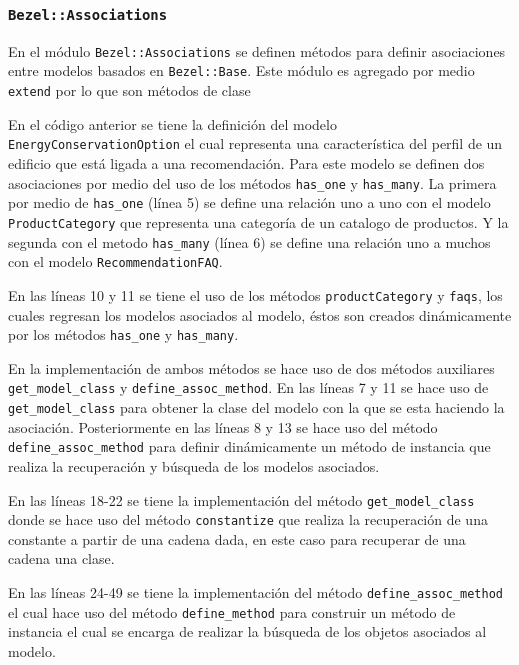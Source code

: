 \subsubsection{\texttt{Bezel::Associations}}

En el módulo \texttt{Bezel::Associations} se definen métodos para definir
asociaciones entre modelos basados en \texttt{Bezel::Base}. Este módulo
es agregado por medio \texttt{extend} por lo que son métodos de clase



En el código anterior se tiene la definición del modelo
\texttt{EnergyConservationOption} el cual representa una característica del perfil
de un edificio que está ligada a una recomendación. Para este modelo se definen
dos asociaciones por medio del uso de los métodos \texttt{has\_one} y
\texttt{has\_many}. La primera por medio de \texttt{has\_one} (línea 5) se define
una relación uno a uno con el modelo \texttt{ProductCategory} que representa una
categoría de un catalogo de productos. Y la segunda con el metodo \texttt{has\_many}
(línea 6) se define una relación uno a muchos con el
modelo \texttt{RecommendationFAQ}.

En las líneas 10 y 11 se tiene el uso de los métodos \texttt{productCategory} y
\texttt{faqs}, los cuales regresan los modelos asociados al modelo, éstos son creados
dinámicamente por los métodos \texttt{has\_one} y \texttt{has\_many}.



En la implementación de ambos métodos se hace uso de dos métodos auxiliares
\texttt{get\_model\_class} y \texttt{define\_assoc\_method}.
En las líneas 7 y 11 se hace uso de \texttt{get\_model\_class} para obtener
la clase del modelo con la que se esta haciendo la asociación. Posteriormente en las
líneas 8 y 13 se hace uso del método \texttt{define\_assoc\_method} para
definir dinámicamente un método de instancia que realiza la recuperación
y búsqueda de los modelos asociados.

En las líneas 18-22 se tiene la implementación del método \texttt{get\_model\_class}
donde se hace uso del método \texttt{constantize} que realiza la recuperación
de una constante a partir de una cadena dada, en este caso para recuperar de
una cadena una clase.

En las líneas 24-49 se tiene la implementación del método
\texttt{define\_assoc\_method} el cual hace uso del método \texttt{define\_method}
para construir un método de instancia el cual se encarga de realizar la búsqueda de
los objetos asociados al modelo.

